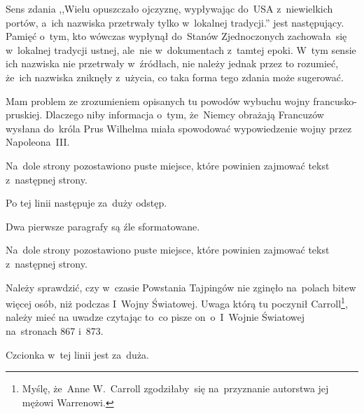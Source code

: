 \documentclass[a4paper,11pt]{article}
\begin{document}
\vspace{\spaceFour}


\start {} Sens zdania ,,Wielu opuszczało ojczyznę,
wypływając do~USA z~niewielkich portów, a~ich nazwiska przetrwały
tylko w~lokalnej tradycji.'' jest następujący. Pamięć o~tym, kto
wówczas wypłynął do~Stanów Zjednoczonych zachowała~się w~lokalnej
tradycji ustnej, ale~nie w~dokumentach z~tamtej epoki. W~tym sensie
ich nazwiska nie przetrwały w~źródłach, nie należy jednak przez to
rozumieć, że~ich nazwiska zniknęły z~użycia, co taka forma tego zdania
może sugerować.

\vspace{\spaceFour}


\start {} Mam problem ze zrozumieniem opisanych tu powodów
wybuchu wojny francusko-pruskiej. Dlaczego niby informacja
o~tym, że~Niemcy obrażają Francuzów wysłana do~króla Prus Wilhelma
miała spowodować wypowiedzenie wojny przez Napoleona~III.

\vspace{\spaceFour}


\start {} Na~dole strony pozostawiono puste miejsce, które
powinien zajmować tekst z~następnej strony.

\vspace{\spaceFour}


\start {} Po tej linii następuje za~duży odstęp.

\vspace{\spaceFour}


\start {} Dwa pierwsze paragrafy są źle sformatowane.

\vspace{\spaceFour}


\start {} Na~dole strony pozostawiono puste miejsce, które
powinien zajmować tekst z~następnej strony.

\vspace{\spaceFour}


\start {} Należy sprawdzić, czy w~czasie Powstania Tajpingów
nie zginęło na~polach bitew więcej osób, niż podczas I~Wojny
Światowej. Uwaga którą tu poczynił Carroll\footnote{Myślę, że~Anne
  W.~Carroll zgodziłaby~się na~przyznanie autorstwa jej mężowi
  Warrenowi.}, należy mieć na uwadze czytając to~co pisze
on~o~I~Wojnie Światowej na~stronach 867 i~873.

\vspace{\spaceFour}


\start {} Czcionka w~tej linii jest za~duża.
\end{document}
